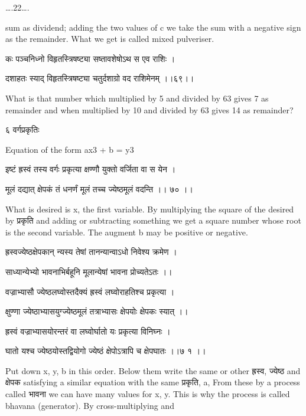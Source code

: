 \documentclass[]{article}
\date{}
\begin{document}
{\ldots{}.22\ldots{}. }

{sum as dividend; adding the two values of c we take the sum with a
negative sign as the remainder. What we get is called mixed pulveriser.}

{कः पञ्चनिध्नो विहृतस्त्रिषष्ट्या सष्तावशेषोऽथ स एव राशिः । }

{दशाहतः स्याद् विहृतस्त्रिषष्ट्या चतुर्दशाग्रो वद राशिमेनम् ।।६९।। }

{What is that number which multiplied by 5 and divided by 63 gives 7 as
remainder and when multiplied by 10 and divided by 63 gives 14 as
remainder?}

{६ वर्गप्रकृतिः }

{Equation of the form ax}{3}{ + b = y}{3}

{इष्टं ह्रस्वं तस्य वर्गः प्रकृत्या क्षण्णौ युक्तो वर्जिता वा स येन । }

{मूलं दद्यात् क्षेपकं तं धनर्णं मूलं तच्च ज्येष्ठमूलं वदन्ति ।। ७० ।।}{
}

{What is desired is x, the first variable. By multiplying the square of
the desired by प्रकृति and adding or subtracting something we get a
square number whose root is the second variable. The augment b may be
positive or negative. }

{ह्रस्वज्येष्ठक्षेपकान् न्यस्य तेषां तानन्यान्वाऽधो निवेश्य क्रमेण । }

{साध्यान्येभ्यो भावनाभिर्बहूनि मूलान्येषां भावना प्रोच्यतेऽतः ।। }

{वज्राभ्यासौ ज्येष्ठलघ्वोस्तदैक्यं ह्रस्वं लघ्वोराहतिश्च प्रकृत्या । }

{क्षुण्णा ज्येष्ठाभ्यासयुग्ज्येष्ठमूलं तत्राभ्यासः क्षेपयोः क्षेपकः
स्यात् ।। }

{ह्रस्वं वज्राभ्यासयोरन्तरं वा लघ्वोर्घातो यः प्रकृत्या विनिघ्नः । }

{घातो यश्च ज्येष्ठयोस्तद्वियोगो ज्येष्ठं क्षेपोऽत्रापि च क्षेपघातः ।।७ १
।। }

{Put down x, y, b in this order. Below them write the same or other
ह्रस्व, ज्येष्ठ and क्षेपक satisfying a similar equation with the same
प्रकृति, a, From these by a process called भावना we can have many values
for x, y. This is why the process is called bhavana (generator). By
cross-multiplying and\\
}
\end{document}
